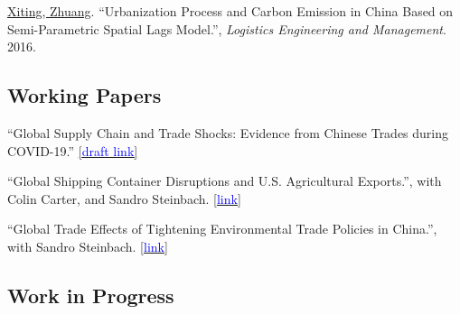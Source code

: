\documentclass[11 pt,letterpaper]{article}
\renewenvironment{itemize}{
	\begin{list}{}{
			\setlength{\leftmargin}{1.5em}
		}
	}{
	\end{list}
}
\begin{document}
\begin{itemize}
		 \item[-]	\underline{Xiting, Zhuang}. ``Urbanization Process and Carbon Emission in China Based on Semi-Parametric Spatial Lags Model.'',   \textit{Logistics Engineering and Management}. 2016. 
 

 	
 
		\end{itemize}
	
 
		
		
		
		
	\subsection*{\textbf{Working Papers}}
	
	\begin{itemize}
	

\item[-]	``Global Supply Chain and Trade Shocks: Evidence from Chinese Trades during COVID-19.''
\href{https://www.dropbox.com/scl/fi/8ovyx59cz62jw1ttvlfw0/Manuscript.pdf?rlkey=vqv6noi2dg0ohhwbthuuqdsfa&dl=0}{[{\underline{\textcolor{blue}{draft link}}}]}  




	 \item[-]	``Global Shipping Container Disruptions and U.S. Agricultural Exports.'',  with Colin Carter, and Sandro Steinbach. 
	  	\href{http://dx.doi.org/10.22004/ag.econ.320397}{[{\underline{\textcolor{blue}{link}}}]}
	
	
 
 

 
	
 		
	 \item[-] ``Global Trade Effects of Tightening Environmental Trade Policies in China.'', with Sandro Steinbach. 
\href{https://www.dropbox.com/scl/fi/21o4ldsv04zo4w7bs6y5w/Manuscript.pdf?rlkey=phzrh7uhti8zm0wxpn786gu94&dl=0}{[{\underline{\textcolor{blue}{link}}}]}

 

	\end{itemize}
	
 
 \subsection*{\textbf{ Work in Progress}}
 
\end{document}
